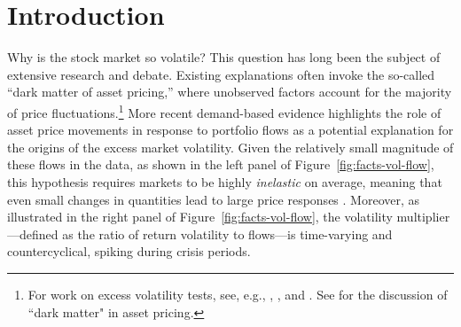 \section{Introduction}
\noindent Why is the stock market so volatile? This question has long been the subject of extensive research and debate.
Existing explanations often invoke the so-called ``dark matter of asset pricing,'' where unobserved factors account for the majority of price fluctuations.\footnote{For work on excess volatility tests, see, e.g., \cite{leroy1981present}, \cite{shiller1981,shiller1992market}, and \cite{cochrane1992explaining}. See \citet{chen2024measuring} for the discussion of ``dark matter" in asset pricing.} 
More recent demand-based evidence highlights the role of asset price movements in response to portfolio flows as a potential explanation for the origins of the excess market volatility.
Given the relatively small magnitude of these flows in the data, as shown in the left panel of Figure~\ref{fig:facts-vol-flow}, this hypothesis requires markets to be highly \textit{inelastic} on average, meaning that even small changes in quantities lead to large price responses \citep{gabaix2020search}. 
Moreover, as illustrated in the right panel of Figure~\ref{fig:facts-vol-flow}, the volatility multiplier---defined as the ratio of return volatility to flows---is time-varying and countercyclical, spiking during crisis periods.


